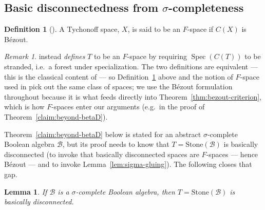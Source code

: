 \documentclass{amsart}
\newtheorem{lemma}[theorem]{Lemma}
\theoremstyle{definition}
\newtheorem{definition}[theorem]{Definition}
\theoremstyle{remark}
\newtheorem{remark}[theorem]{Remark}
\newcommand{\Spec}[1]{\operatorname{Spec}\left(#1\right)}
\newcommand{\cont}[1]{C\left(#1\right)}
\begin{document}
\subsection{Basic disconnectedness from \(\sigma\)-completeness}

\begin{definition}[\cite{GillmanHenriksen1956}]\label{def:F-space}
A Tychonoff space, $X$, is said to be an $F$-space if $\cont{X}$ is B\'ezout.
\end{definition}

\begin{remark}
\cite{bezhanishvili-tressl-2026} instead \emph{defines} $T$ to be an
$F$-space by requiring $\Spec{\cont{T}}$ to be stranded, i.e.\ a
forest under specialization. The two definitions are equivalent
--- this is the classical content of \cite[Theorem in
14.25]{GillmanJerison} --- so Definition~\ref{def:F-space} above and the
notion of $F$-space used in \cite{bezhanishvili-tressl-2026} pick out the
same class of spaces; we use the Bézout formulation throughout because it
is what feeds directly into Theorem~\ref{thm:bezout-criterion}, which is
how $F$-spaces enter our arguments (e.g.\ in the proof of
Theorem~\ref{claim:beyond-betaD}).
\end{remark}

Theorem~\ref{claim:beyond-betaD} below is stated for an abstract
$\sigma$-complete Boolean algebra $\mathcal B$, but its proof needs to
know that $T=\mathrm{Stone}(\mathcal B)$ is basically disconnected (to
invoke that basically disconnected spaces are $F$-spaces --- hence
Bézout --- and to invoke Lemma~\ref{lem:sigma-gluing}). The following
closes that gap.

\begin{lemma}\label{lem:sigma-complete-implies-bd}
If $\mathcal B$ is a $\sigma$-complete Boolean algebra, then
$T=\mathrm{Stone}(\mathcal B)$ is basically disconnected.
\end{lemma}
\end{document}
